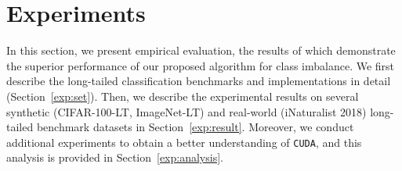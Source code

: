 \documentclass{article}
\def\code#1{\texttt{#1}}
\newcommand{\alg}{\code{CUDA}\xspace}
\begin{document}
 \section{Experiments}
\label{sec:exp}
In this section, we present empirical evaluation, the results of which demonstrate the superior performance of our proposed algorithm for class imbalance. We first describe the long-tailed classification benchmarks and implementations in detail (Section~\ref{exp:set}). Then, we describe the experimental results on several synthetic (CIFAR-100-LT, ImageNet-LT) and real-world (iNaturalist 2018) long-tailed benchmark datasets in Section~\ref{exp:result}. Moreover, we conduct additional experiments to obtain a better understanding of \alg, and this analysis is provided in Section~\ref{exp:analysis}.
\end{document}
